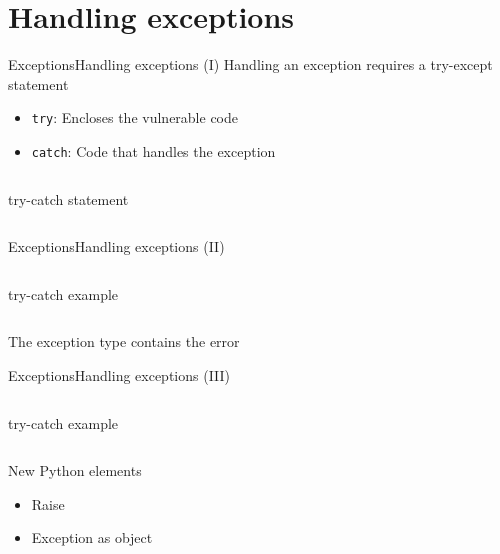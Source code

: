 \documentclass[10pt,compress]{beamer} %
\begin{document}
\section{Handling exceptions}
\begin{frame}{Exceptions}{Handling exceptions (I)}
	Handling an exception requires a try-except statement
	\begin{itemize}
		\item \texttt{try}: Encloses the vulnerable code
		\item \texttt{catch}: Code that handles the exception
	\end{itemize}

    \begin{columns}
	\begin{block}{try-catch statement}
	\vspace{-0.2cm}
		
	\vspace{-0.2cm}
	\end{block}
	\end{columns}
\end{frame}

\begin{frame}{Exceptions}{Handling exceptions (II)}
    \begin{columns}
	\begin{exampleblock}{try-catch example}
	\vspace{-0.2cm}
		
	\vspace{-0.2cm}
	\end{exampleblock}
	\end{columns}
	\bigskip
	The exception type contains the error
\end{frame}

\begin{frame}{Exceptions}{Handling exceptions (III)}
	\vspace{-0.2cm}
    \begin{columns}
	\begin{exampleblock}{try-catch example}
	\vspace{-0.2cm}
		
	\vspace{-0.2cm}
	\end{exampleblock}
	\end{columns}
	\bigskip
	New Python elements
		\begin{itemize}
		\item Raise
        \item Exception as object
		\end{itemize}
\end{frame}
\end{document}
